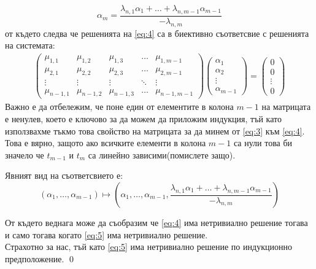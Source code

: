\documentclass[a4paper,12pt,fleqn]{article}
\begin{document}
{\begin{equation*}
        \alpha_{m}=\frac{\lambda_{n,1}\alpha_{1}+\dots+\lambda_{n,m-1}\alpha_{m-1}}{-\lambda_{n,m}}
      \end{equation*}
      от където следва че решенията на \eqref{eq:4} са в биективно съответсвие с решенията на системата:
      \begin{gather} \label{eq:5}
        \begin{pmatrix}
          \mu_{1, 1} & \mu_{1, 2} & \mu_{1, 3} & \dots & \mu_{1,m-1} \\
          \mu_{2, 1} & \mu_{2, 2} & \mu_{2, 3} & \dots & \mu_{2,m-1} \\
          \vdots & \vdots & \vdots & \ddots & \vdots \\
          \mu_{n-1, 1} & \mu_{n-1, 2} & \mu_{n-1, 3} & \dots & \mu_{n-1,m-1}
        \end{pmatrix}
        \begin{pmatrix}
          \alpha_{1} \\
          \alpha_{2} \\
          \vdots \\
          \alpha_{m-1}
        \end{pmatrix}
        =
        \begin{pmatrix}
          0 \\
          0 \\
          \vdots \\
          0
        \end{pmatrix}
      \end{gather} 
      Важно е да отбележим, че поне един от елементите в колона \( m-1 \) на матрицата е ненулев, което е ключово за да можем да приложим индукция, тъй като използвахме тъкмо това свойство на матрицата за да минем от \eqref{eq:3} към \eqref{eq:4}. Това е вярно, защото ако всичките елементи в колона \( m-1 \) са нули това би значело че \( t_{m-1} \) и \( t_{m} \) са линейно зависими(помислете защо).

      Явният вид на съответсвието е:
      \begin{equation*}
        \left( \alpha_{1},\dots,\alpha_{m-1} \right) \longmapsto \left( \alpha_{1},\dots,\alpha_{m-1}, \frac{\lambda_{n,1}\alpha_{1}+\dots+\lambda_{n,m-1}\alpha_{m-1}}{-\lambda_{n,m}}\right)
      \end{equation*}

      От където веднага може да съобразим че \eqref{eq:4} има нетривиално решение тогава и само тогава когато \eqref{eq:5} има нетривиално решение. \\
      Страхотно за нас, тъй като \eqref{eq:5} има нетривиално решение по индукционно предположение.
      \qed
    }



    
\end{document}
